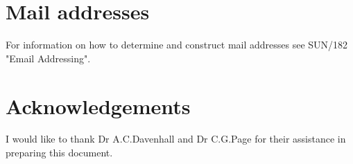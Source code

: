 \section{Mail addresses}

For information on how to determine and construct mail addresses
see SUN/182 "Email Addressing".

\section{Acknowledgements}

I would like to thank Dr A.C.Davenhall and Dr C.G.Page for their assistance
in preparing this document.


